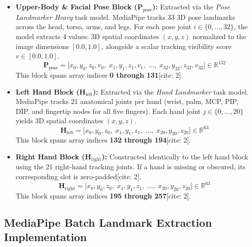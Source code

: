 \documentclass[12pt,a4paper]{article}
\begin{document}
\begin{itemize}
    \item \textbf{Upper-Body \& Facial Pose Block ($\mathbf{P}_{\text{pose}}$):} Extracted via the \textit{Pose Landmarker Heavy} task model. MediaPipe tracks 33 3D pose landmarks across the head, torso, arms, and legs. For each pose joint $i \in \{0, \dots, 32\}$, the model extracts 4 values: 3D spatial coordinates $(x, y, z)$ normalized to the image dimensions $[0.0, 1.0]$, alongside a scalar tracking visibility score $v \in [0.0, 1.0]$.
    \begin{equation}
    \mathbf{P}_{\text{pose}} = \big[ x_0, y_0, z_0, v_0, \; x_1, y_1, z_1, v_1, \; \dots, \; x_{32}, y_{32}, z_{32}, v_{32} \big] \in \mathbb{R}^{132}
    \end{equation}
    This block spans array indices \textbf{0 through 131}[cite: 2].

    \item \textbf{Left Hand Block ($\mathbf{H}_{\text{left}}$):} Extracted via the \textit{Hand Landmarker} task model. MediaPipe tracks 21 anatomical joints per hand (wrist, palm, MCP, PIP, DIP, and fingertip nodes for all five fingers). Each hand joint $j \in \{0, \dots, 20\}$ yields 3D spatial coordinates $(x, y, z)$.
    \begin{equation}
    \mathbf{H}_{\text{left}} = \big[ x_0, y_0, z_0, \; x_1, y_1, z_1, \; \dots, \; x_{20}, y_{20}, z_{20} \big] \in \mathbb{R}^{63}
    \end{equation}
    This block spans array indices \textbf{132 through 194}[cite: 2].

    \item \textbf{Right Hand Block ($\mathbf{H}_{\text{right}}$):} Constructed identically to the left hand block using the 21 right-hand tracking joints. If a hand is missing or obscured, its corresponding slot is zero-padded[cite: 2].
    \begin{equation}
    \mathbf{H}_{\text{right}} = \big[ x_0, y_0, z_0, \; x_1, y_1, z_1, \; \dots, \; x_{20}, y_{20}, z_{20} \big] \in \mathbb{R}^{63}
    \end{equation}
    This block spans array indices \textbf{195 through 257}[cite: 2].
\end{itemize}

\subsection{MediaPipe Batch Landmark Extraction Implementation}
\end{document}
